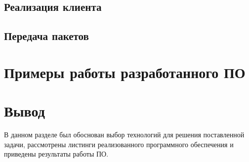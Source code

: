 \subsection{Реализация клиента}

\subsection{Передача пакетов}

\section{Примеры работы разработанного ПО}

\section*{Вывод}

В данном разделе был обоснован выбор технологий для решения поставленной задачи, рассмотрены листинги реализованного программного обеспечения и приведены результаты работы ПО.